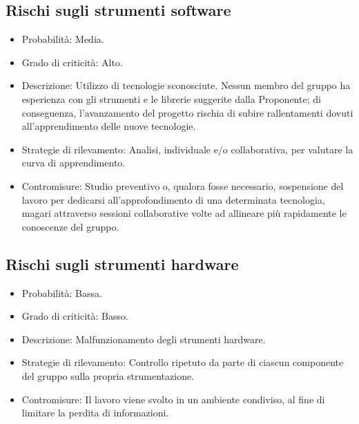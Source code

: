 \subsection{Rischi sugli strumenti software}
\begin{itemize}
  \item Probabilità: Media.
  \item Grado di criticità: Alto.
  \item Descrizione: Utilizzo di tecnologie sconosciute. Nessun membro del gruppo ha esperienza con gli strumenti e le librerie suggerite dalla Proponente; di conseguenza, l’avanzamento del progetto rischia di subire rallentamenti dovuti all’apprendimento delle nuove tecnologie.
  \item Strategie di rilevamento: Analisi, individuale e/o collaborativa, per valutare la curva di apprendimento.
  \item Contromisure: Studio preventivo o, qualora fosse necessario, sospensione del lavoro per dedicarsi all’approfondimento di una determinata tecnologia, magari attraverso sessioni collaborative volte ad allineare più rapidamente le conoscenze del gruppo.
\end{itemize}

\subsection{Rischi sugli strumenti hardware}
\begin{itemize}
  \item Probabilità: Bassa.
  \item Grado di criticità: Basso.
  \item Descrizione: Malfunzionamento degli strumenti hardware.
  \item Strategie di rilevamento: Controllo ripetuto da parte di ciascun componente del gruppo sulla propria strumentazione.
  \item Contromisure: Il lavoro viene svolto in un ambiente condiviso, al fine di limitare la perdita di informazioni.
\end{itemize}


